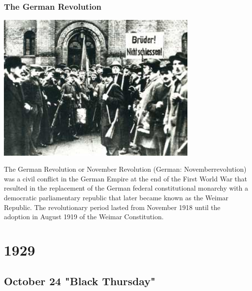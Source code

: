 \documentclass[11pt]{report}
\begin{document}
\subsection{The German Revolution}
\vspace{2mm}\begin{center}\includegraphics[width=10cm]{./img/germanRevolution.jpg}\end{center}
The German Revolution or November Revolution (German: Novemberrevolution) was a civil conflict in the German Empire at the end of the First World War that resulted in the replacement of the German federal constitutional monarchy with a democratic parliamentary republic that later became known as the Weimar Republic. The revolutionary period lasted from November 1918 until the adoption in August 1919 of the Weimar Constitution.

\chapter{1929}
\section{October 24 "Black Thursday"}
\end{document}
